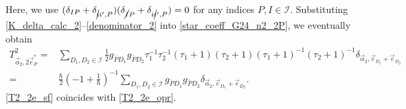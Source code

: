 \documentclass[10pt,a4paper]{amsart}
\numberwithin{equation}{section}
\begin{document}
Here, we use
$
 (
 \delta_{IP}
 +
 \delta_{\cancel{i}i',P}
 )
 (
 \delta_{\cancel{I}P}
 +
 \delta_{i\cancel{i}',P}
 )
=
0
$
for any indices
$
P,
I
\in
\mathcal{I}
$.
Substituting \eqref{K_delta_calc_2}--\eqref{denominator_2} into \eqref{star_coeff_G24_n2_2P}, we eventually obtain
\begin{align}
T^{2}_{\vec{\alpha}_{2},2\vec{e}_{P}^{\ast}}
={}&
\sum_{
D_{1},D_{2}
\in
\mathcal{I}
}
\frac{1}{2}
g_{\overline{P}D_{1}}
g_{\overline{P}D_{2}}
\tau_{1}^{-1}
\tau_{2}^{-1}
 (
\tau_{1}
+
1
 )
 (
\tau_{2}
+
1
 )
 (
\tau_{1}
+
1
 )^{-1}
 (
\tau_{2}
+
1
 )^{-1}
\delta_{
\vec{\alpha}_{2},
\vec{e}_{D_{1}}
+
\vec{e}_{D_{2}}
}
\nonumber
\\
={}&
\frac{\hbar}{2}
 \left(
-1
+
\frac{1}{\hbar}
 \right)^{-1}
\sum_{
D_{1},D_{2}
\in
\mathcal{I}
}
g_{\overline{P}D_{1}}
g_{\overline{P}D_{2}}
\delta_{
\vec{\alpha}_{2},
\vec{e}_{D_{1}}
+
\vec{e}_{D_{2}}
}
.
\label{T2_2e_sf}
\end{align}
\eqref{T2_2e_sf} coincides with \eqref{T2_2e_opr}.
\end{document}
